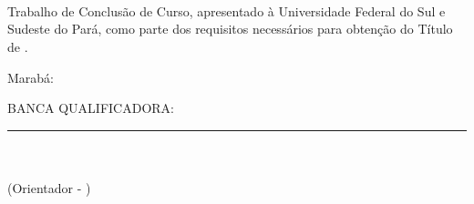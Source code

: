 %
%

\makeatletter
\begin{folhadeaprovacao}
	\thispagestyle{empty} %
	\setlength{\baselineskip}{1.5\baselineskip}
	\begin{center}
		
		\textbf{\expandafter\expandafter{\imprimirnomeautor}}\\
		\vspace*{2.1cm} %
		\textbf{\expandafter\uppercase\expandafter{\imprimirtitulotb}}\\
		\abntex@ifnotempty{\imprimirsubtitulo} {%
			\textbf{\expandafter\expandafter{\imprimirsubtitulo}}\\
		}
		
	\end{center}
	
	\vspace*{1.8cm}%
	\hfill %
	\begin{minipage}{8cm} %
		\begin{normalsize} %
			\setlength{\baselineskip}{0.9\baselineskip}
			
			{Trabalho de Conclusão de Curso, apresentado à Universidade Federal do Sul e Sudeste do Pará, como parte dos requisitos necessários para obtenção do Título de \imprimirgrau.}\\				
			
		\end{normalsize} %
	\end{minipage} %

	\vspace*{0.6cm} %
	\normalsize %
	\begin{flushright}
		Marabá: \imprimirdataapresentacao \\ %
	\end{flushright}
	
	\begin{flushleft}
		BANCA QUALIFICADORA:\\
		
		\vspace*{1.45cm} %
		\rule{9cm}{.1 mm}\\
		\imprimirtitulacaoorientador{ }{\imprimirorientador}\\
		(Orientador - \imprimirinstOrientador)\\
		

\end{flushleft}
\end{folhadeaprovacao}
